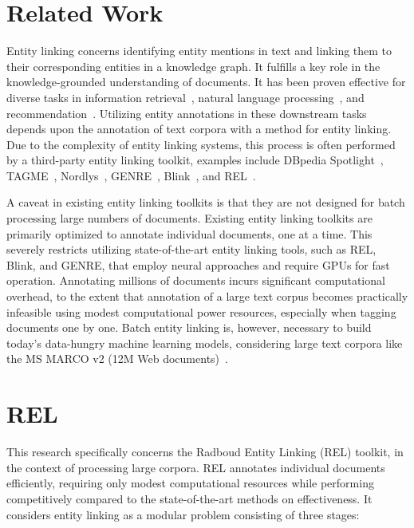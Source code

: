 \section{Related Work}
Entity linking concerns identifying entity mentions in text and linking them to their corresponding entities in a knowledge graph. It fulfills a key role in the knowledge-grounded understanding of documents. It has been proven effective for diverse tasks in information retrieval~\citep{Gerritse:2022:EMBERT, Gerritse:2020:GEER, doc-ranking-entity, el-ranking-hasibi, el-balog, query-recommendation-entity, chatterjee2022bert}, natural language processing~\citep{lin-etal-2012-entity, watson}, and recommendation~\citep{yang-etal-2018-collective}.
Utilizing entity annotations in these downstream tasks depends upon the annotation of text corpora with a method for entity linking. Due to the complexity of entity linking systems, this process is often performed by a third-party entity linking toolkit, examples include DBpedia Spotlight~\citep{dbpedia-spotlight}, TAGME~\citep{tagme}, Nordlys~\citep{nordlys}, GENRE~\citep{genre}, Blink~\citep{blink}, and REL~\citep{rel}.

A caveat in existing entity linking toolkits is that they are not designed for batch processing large numbers of documents. Existing entity linking toolkits are primarily optimized to annotate individual documents, one at a time. This severely restricts utilizing state-of-the-art entity linking tools, such as REL, Blink, and GENRE, that employ neural approaches and require GPUs for fast operation. Annotating millions of documents incurs significant computational overhead, to the extent that annotation of a large text corpus becomes practically infeasible using modest computational power resources, especially when tagging documents one by one. Batch entity linking is, however, necessary to build today's data-hungry machine learning models, considering large text corpora like the MS MARCO v2 (12M Web documents)~\citep{msmarco}.

\section{REL}
This research specifically concerns the Radboud Entity Linking (REL) toolkit, in the context of processing large corpora. REL annotates individual documents efficiently, requiring only modest computational resources while performing competitively compared to the state-of-the-art methods on effectiveness. It considers entity linking as a modular problem consisting of three stages:

